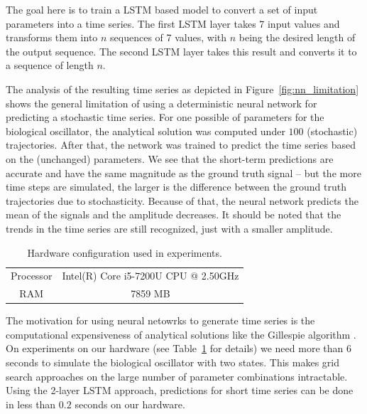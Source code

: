 \documentclass{article}
\begin{document}
The goal here is to train a LSTM based 
model to convert a set of input parameters into a time series. The first 
LSTM layer
takes 7 input values and transforms them into $n$ sequences of 7 values, with 
$n$ being the desired length of the output sequence. The second LSTM layer 
takes this result and converts it to a sequence of length $n$. 

The analysis of the resulting time series as depicted in 
Figure~\ref{fig:nn_limitation} shows the general limitation of using a
deterministic neural network for predicting a stochastic time series. For one 
possible of parameters for the biological oscillator, the analytical solution 
was computed under $100$ (stochastic) trajectories. After that, the network was 
trained to predict the time series based on the (unchanged) parameters. We see 
that the short-term predictions are accurate and have the same magnitude as the
ground truth signal -- but the more time steps are simulated, the larger is the
difference between the ground truth trajectories due to stochasticity. Because
of that, the neural network predicts the mean of the signals and the amplitude
decreases. It should be noted that the trends in the time series are still 
recognized, just with a smaller amplitude.

\begin{table}
  \centering
  \begin{tabular}{cc}
    Processor & Intel(R) Core i5-7200U CPU @ 2.50GHz \\
    RAM & 7859 MB \\
  \end{tabular}
  \caption{Hardware configuration used in experiments.}
  \label{tab:hardware}
\end{table}

The motivation for using neural netowrks to generate time series is the 
computational expensiveness of analytical solutions like the Gillespie 
algorithm \cite{gillespie1977}. On experiments on our hardware 
(see Table~\ref{tab:hardware} for details) 
we need more than 6 seconds to simulate the biological oscillator with two
states. This makes grid search approaches on the large number of parameter 
combinations intractable. Using the 2-layer LSTM approach, predictions for 
short time series can be done in less than $0.2$ seconds on our hardware.
\end{document}
